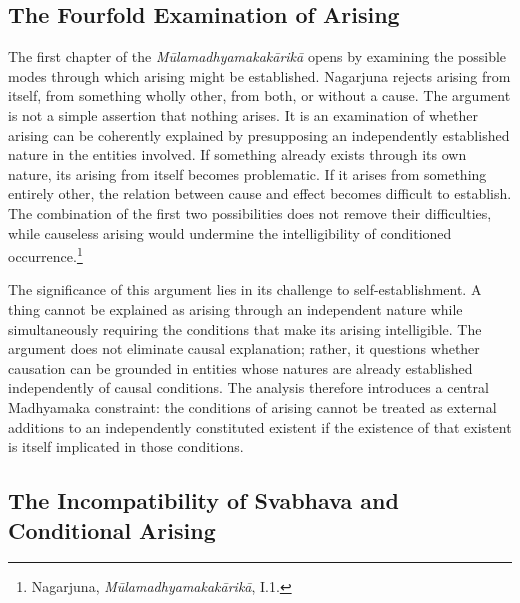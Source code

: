 \subsection{The Fourfold Examination of Arising}
\label{subsec:ch08_s18_ss04}

\label{para:VS.B01.P01.C08.S18.SS04.P001}
The first chapter of the \emph{M\={u}lamadhyamakak\={a}rik\={a}} opens by examining the possible modes through which arising might be established. Nagarjuna rejects arising from itself, from something wholly other, from both, or without a cause. The argument is not a simple assertion that nothing arises. It is an examination of whether arising can be coherently explained by presupposing an independently established nature in the entities involved. If something already exists through its own nature, its arising from itself becomes problematic. If it arises from something entirely other, the relation between cause and effect becomes difficult to establish. The combination of the first two possibilities does not remove their difficulties, while causeless arising would undermine the intelligibility of conditioned occurrence.\footnote{Nagarjuna, \emph{M\={u}lamadhyamakak\={a}rik\={a}}, I.1.}

\label{para:VS.B01.P01.C08.S18.SS04.P002}
The significance of this argument lies in its challenge to self-establishment. A thing cannot be explained as arising through an independent nature while simultaneously requiring the conditions that make its arising intelligible. The argument does not eliminate causal explanation; rather, it questions whether causation can be grounded in entities whose natures are already established independently of causal conditions. The analysis therefore introduces a central Madhyamaka constraint: the conditions of arising cannot be treated as external additions to an independently constituted existent if the existence of that existent is itself implicated in those conditions.

\subsection{The Incompatibility of Svabhava and Conditional Arising}
\label{subsec:ch08_s18_ss05}

